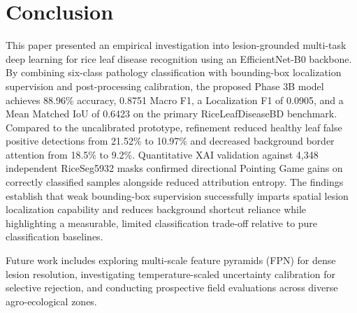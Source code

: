 \section{Conclusion}
\label{sec:conclusion}

This paper presented an empirical investigation into lesion-grounded multi-task deep learning for rice leaf disease recognition using an EfficientNet-B0 backbone. By combining six-class pathology classification with bounding-box localization supervision and post-processing calibration, the proposed Phase 3B model achieves 88.96\% accuracy, 0.8751 Macro F1, a Localization F1 of 0.0905, and a Mean Matched IoU of 0.6423 on the primary RiceLeafDiseaseBD benchmark. Compared to the uncalibrated prototype, refinement reduced healthy leaf false positive detections from 21.52\% to 10.97\% and decreased background border attention from 18.5\% to 9.2\%. Quantitative XAI validation against 4,348 independent RiceSeg5932 masks confirmed directional Pointing Game gains on correctly classified samples alongside reduced attribution entropy. The findings establish that weak bounding-box supervision successfully imparts spatial lesion localization capability and reduces background shortcut reliance while highlighting a measurable, limited classification trade-off relative to pure classification baselines.

Future work includes exploring multi-scale feature pyramids (FPN) for dense lesion resolution, investigating temperature-scaled uncertainty calibration for selective rejection, and conducting prospective field evaluations across diverse agro-ecological zones.
